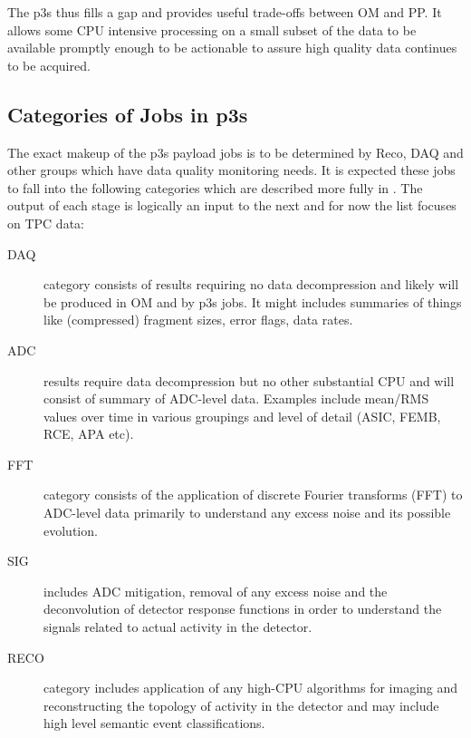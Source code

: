 \documentclass[pdftex,12pt,letter]{article}
\begin{document}
The p3s thus fills a gap and provides useful trade-offs between OM and
PP.  It allows some CPU intensive processing on a small subset of the
data to be available promptly enough to be actionable to assure high
quality data continues to be acquired. 


\subsection{Categories of Jobs in p3s}
\label{sec:categories}

The exact makeup of the p3s payload jobs is to be determined by Reco,
DAQ and other groups which have data quality monitoring needs.  It is
expected these jobs to fall into the following categories which are
described more fully in \cite{docdb1811}.  The output of each stage is
logically an input to the next and for now the list focuses on TPC data:

\begin{description}

\item[DAQ] category consists of results requiring no data
  decompression and likely will be produced in OM and by p3s jobs.  It
  might includes summaries of things like (compressed) fragment sizes,
  error flags, data rates.

\item[ADC] results require data decompression but no other substantial
  CPU and will consist of summary of ADC-level data.  Examples include
  mean/RMS values over time in various groupings and level of detail
  (ASIC, FEMB, RCE, APA etc).

\item[FFT] category consists of the application of discrete Fourier
  transforms (FFT) to ADC-level data primarily to understand any
  excess noise and its possible evolution.

\item[SIG] includes ADC mitigation, removal of any excess noise and
  the deconvolution of detector response functions in order to
  understand the signals related to actual activity in the detector.

\item[RECO] category includes application of any high-CPU algorithms
  for imaging and reconstructing the topology of activity in the
  detector and may include high level semantic event classifications.

\end{description}
\end{document}

